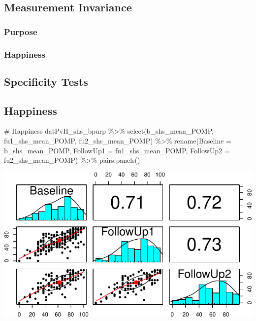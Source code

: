 \documentclass[
  letterpaper,
  DIV=11,
  numbers=noendperiod]{scrartcl}
\newenvironment{Shaded}{\begin{snugshade}}{\end{snugshade}}
\newcommand{\AttributeTok}[1]{\textcolor[rgb]{0.40,0.45,0.13}{#1}}
\newcommand{\CommentTok}[1]{\textcolor[rgb]{0.37,0.37,0.37}{#1}}
\newcommand{\FunctionTok}[1]{\textcolor[rgb]{0.28,0.35,0.67}{#1}}
\newcommand{\NormalTok}[1]{\textcolor[rgb]{0.00,0.23,0.31}{#1}}
\newcommand{\SpecialCharTok}[1]{\textcolor[rgb]{0.37,0.37,0.37}{#1}}
\begin{document}
\subsection{Measurement Invariance}\label{measurement-invariance}

\subsubsection{Purpose}\label{purpose}

\subsubsection{Happiness}\label{happiness}

\subsection{Specificity Tests}\label{specificity-tests}

\subsection{Happiness}\label{happiness-1}

\begin{Shaded}
\begin{Highlighting}[]
\CommentTok{\# Happiness}
\NormalTok{datPvH\_shs\_bpurp }\SpecialCharTok{\%\textgreater{}\%} 
  \FunctionTok{select}\NormalTok{(b\_shs\_mean\_POMP, fu1\_shs\_mean\_POMP, fu2\_shs\_mean\_POMP) }\SpecialCharTok{\%\textgreater{}\%}
  \FunctionTok{rename}\NormalTok{(}\AttributeTok{Baseline =}\NormalTok{ b\_shs\_mean\_POMP,}
         \AttributeTok{FollowUp1 =}\NormalTok{ fu1\_shs\_mean\_POMP,}
         \AttributeTok{FollowUp2 =}\NormalTok{ fu2\_shs\_mean\_POMP) }\SpecialCharTok{\%\textgreater{}\%}
  \FunctionTok{pairs.panels}\NormalTok{()}
\end{Highlighting}
\end{Shaded}

\includegraphics{purpose_vs_happiness_supplement_files/figure-pdf/purpose-1.pdf}
\end{document}
